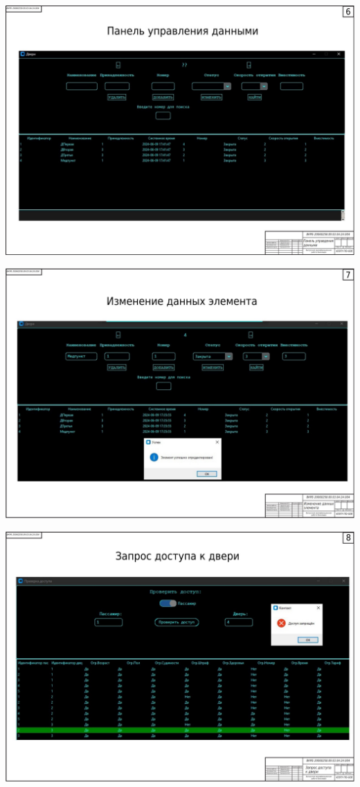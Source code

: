 \begin{landscape}
\begin{плакат}
	\includegraphics[width=0.82\linewidth]{images/плакат6.png}
	\label{fig:6}
\end{плакат}

\begin{плакат}
	\centering
	\includegraphics[width=0.82\linewidth]{images/плакат7.png}
	\label{fig:7}
\end{плакат}

\begin{плакат}
	\centering
	\includegraphics[width=0.82\linewidth]{images/плакат8.png}
	\label{fig:8}
\end{плакат}


\end{landscape}
